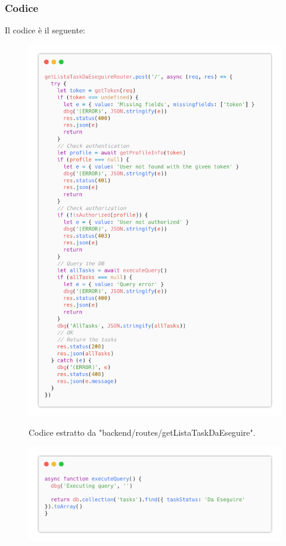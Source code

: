 \documentclass{report}
\begin{document}
\subsubsection*{Codice}

Il codice è il seguente:
\begin{figure}[H]
	\centering\includegraphics[width=1\textwidth]{images/code_da_eseguire.png}

	Codice estratto da "backend/routes/getListaTaskDaEseguire".
\end{figure}
\begin{figure}[H]
	\centering\includegraphics[width=1\textwidth]{images/code_da_eseguire2.png}
\end{figure}
\end{document}
